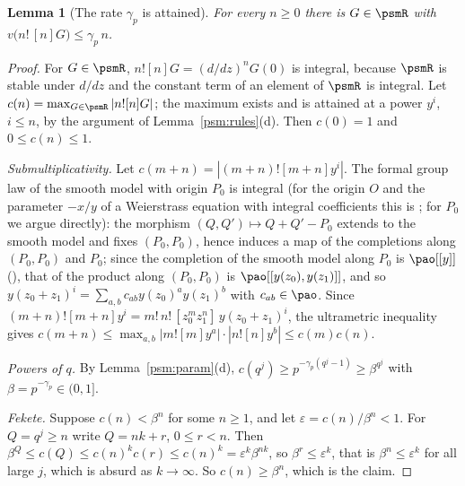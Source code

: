 \documentclass[10pt]{amsart}
\newtheorem{lemma}[theorem]{Lemma}
\theoremstyle{definition}
\theoremstyle{remark}
\begin{document}
\begin{lemma}[The rate $\gamma_p$ is attained]\label{psm:katz}
For every $n\ge0$ there is $G\in\psmR$ with $v\bigl(n!\,[n]G\bigr)\le\gamma_p\,n$.
\end{lemma}
\begin{proof}
For $G\in\psmR$, $n![n]G=(d/dz)^nG(0)$ is integral, because $\psmR$ is stable under $d/dz$ and the
constant term of an element of $\psmR$ is integral. Let $c(n)=\max_{G\in\psmR}|n![n]G|$; the
maximum exists and is attained at a power $y^i$, $i\le n$, by the argument of
Lemma~\ref{psm:rules}(d). Then $c(0)=1$ and $0\le c(n)\le1$.

\emph{Submultiplicativity.} Let $c(m+n)=|(m+n)![m+n]y^i|$. The formal group law of the smooth model
with origin $P_0$ is integral (for the origin $O$ and the parameter $-x/y$ of a Weierstrass equation
with integral coefficients this is \cite[Chapter~IV, \S1]{SilvermanAEC}; for $P_0$ we argue directly): the morphism $(Q,Q')\mapsto Q+Q'-P_0$
extends to the smooth model and fixes $(P_0,P_0)$, hence induces a map of the completions along
$(P_0,P_0)$ and $P_0$; since the completion of the smooth model along $P_0$ is $\pao[[y]]$
({\cite[\S4.3]{P49}}), that of the product along $(P_0,P_0)$ is $\pao[[y(z_0),y(z_1)]]$, and so $y(z_0+z_1)^i=\sum_{a,b}c_{ab}y(z_0)^ay(z_1)^b$
with $c_{ab}\in\pao$. Since $(m+n)![m+n]y^i=m!\,n!\,[z_0^mz_1^n]\,y(z_0+z_1)^i$, the ultrametric
inequality gives $c(m+n)\le\max_{a,b}|m![m]y^a|\cdot|n![n]y^b|\le c(m)c(n)$.

\emph{Powers of $q$.} By Lemma~\ref{psm:param}(d), $c(q^j)\ge p^{-\gamma_p(q^j-1)}\ge
\beta^{q^j}$ with $\beta=p^{-\gamma_p}\in(0,1]$.

\emph{Fekete.} Suppose $c(n)<\beta^n$ for some $n\ge1$, and let $\varepsilon=c(n)/\beta^n<1$. For
$Q=q^j\ge n$ write $Q=nk+r$, $0\le r<n$. Then $\beta^Q\le c(Q)\le c(n)^kc(r)\le c(n)^k=
\varepsilon^k\beta^{nk}$, so $\beta^{r}\le\varepsilon^k$, that is $\beta^n\le\varepsilon^k$ for all
large $j$, which is absurd as $k\to\infty$. So $c(n)\ge\beta^n$, which is the claim.
\end{proof}
\end{document}
